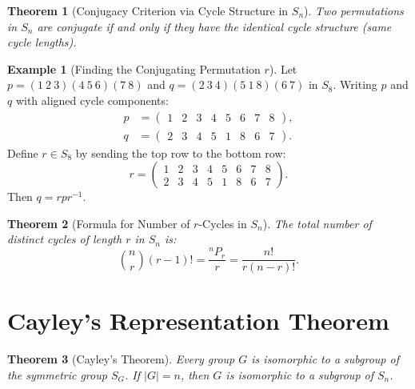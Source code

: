 \documentclass[12pt]{article}
\theoremstyle{definition}
\newtheorem{example}[definition]{Example}
\theoremstyle{plain}
\newtheorem{theorem}{Theorem}[section]
\begin{document}
\begin{theorem}[Conjugacy Criterion via Cycle Structure in $S_n$]
Two permutations in $S_n$ are conjugate if and only if they have the identical cycle structure (same cycle lengths).
\end{theorem}

\begin{example}[Finding the Conjugating Permutation $r$]
Let $p = (1\ 2\ 3)(4\ 5\ 6)(7\ 8)$ and $q = (2\ 3\ 4)(5\ 1\ 8)(6\ 7)$ in $S_8$.
Writing $p$ and $q$ with aligned cycle components:
\begin{align*}
    p &= \begin{pmatrix} 1 & 2 & 3 & 4 & 5 & 6 & 7 & 8 \end{pmatrix}, \\
    q &= \begin{pmatrix} 2 & 3 & 4 & 5 & 1 & 8 & 6 & 7 \end{pmatrix}.
\end{align*}
Define $r \in S_8$ by sending the top row to the bottom row:
\[
r = \begin{pmatrix} 1 & 2 & 3 & 4 & 5 & 6 & 7 & 8 \\ 2 & 3 & 4 & 5 & 1 & 8 & 6 & 7 \end{pmatrix}.
\]
Then $q = r p r^{-1}$.
\end{example}

\begin{theorem}[Formula for Number of $r$-Cycles in $S_n$]
The total number of distinct cycles of length $r$ in $S_n$ is:
\[
\boxed{\binom{n}{r} (r - 1)! = \frac{{}^n P_r}{r} = \frac{n!}{r(n - r)!}}.
\]
\end{theorem}

\section{Cayley's Representation Theorem}

\begin{theorem}[Cayley's Theorem]
Every group $G$ is isomorphic to a subgroup of the symmetric group $S_G$. If $|G| = n$, then $G$ is isomorphic to a subgroup of $S_n$.
\end{theorem}
\end{document}
